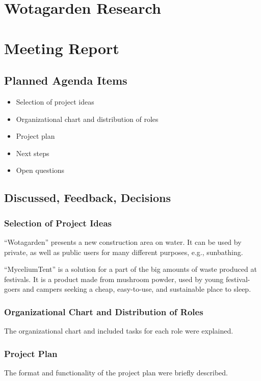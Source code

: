 \documentclass{article}
\begin{document}
\chapter{Wotagarden Research}

\chapter{Meeting Report}

\section{Planned Agenda Items}
\begin{itemize}
    \item Selection of project ideas
    \item Organizational chart and distribution of roles
    \item Project plan
    \item Next steps
    \item Open questions
\end{itemize}

\section{Discussed, Feedback, Decisions}

\subsection{Selection of Project Ideas}
“Wotagarden” presents a new construction area on water. It can be used by private, as well as public users for many different purposes, e.g., sunbathing.

“MyceliumTent” is a solution for a part of the big amounts of waste produced at festivals. It is a product made from mushroom powder, used by young festival-goers and campers seeking a cheap, easy-to-use, and sustainable place to sleep.

\subsection{Organizational Chart and Distribution of Roles}
The organizational chart and included tasks for each role were explained.

\subsection{Project Plan}
The format and functionality of the project plan were briefly described.
\end{document}
